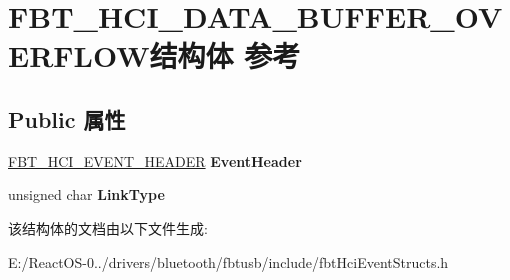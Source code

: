 \hypertarget{struct_f_b_t___h_c_i___d_a_t_a___b_u_f_f_e_r___o_v_e_r_f_l_o_w}{}\section{F\+B\+T\+\_\+\+H\+C\+I\+\_\+\+D\+A\+T\+A\+\_\+\+B\+U\+F\+F\+E\+R\+\_\+\+O\+V\+E\+R\+F\+L\+O\+W结构体 参考}
\label{struct_f_b_t___h_c_i___d_a_t_a___b_u_f_f_e_r___o_v_e_r_f_l_o_w}
\subsection*{Public 属性}
\begin{DoxyCompactItemize}
\item 
\mbox{\label{struct_f_b_t___h_c_i___d_a_t_a___b_u_f_f_e_r___o_v_e_r_f_l_o_w_ae7a3bf7e6d733c6e1a7def9e6d84871d}} 
\hyperlink{struct_f_b_t___h_c_i___e_v_e_n_t___h_e_a_d_e_r}{F\+B\+T\+\_\+\+H\+C\+I\+\_\+\+E\+V\+E\+N\+T\+\_\+\+H\+E\+A\+D\+ER} {\bfseries Event\+Header}
\item 
\mbox{\label{struct_f_b_t___h_c_i___d_a_t_a___b_u_f_f_e_r___o_v_e_r_f_l_o_w_adf07cf86b256103d03586d122666df92}} 
unsigned char {\bfseries Link\+Type}
\end{DoxyCompactItemize}


该结构体的文档由以下文件生成\+:\begin{DoxyCompactItemize}
\item 
E\+:/\+React\+O\+S-\/0../drivers/bluetooth/fbtusb/include/fbt\+Hci\+Event\+Structs.\+h\end{DoxyCompactItemize}

